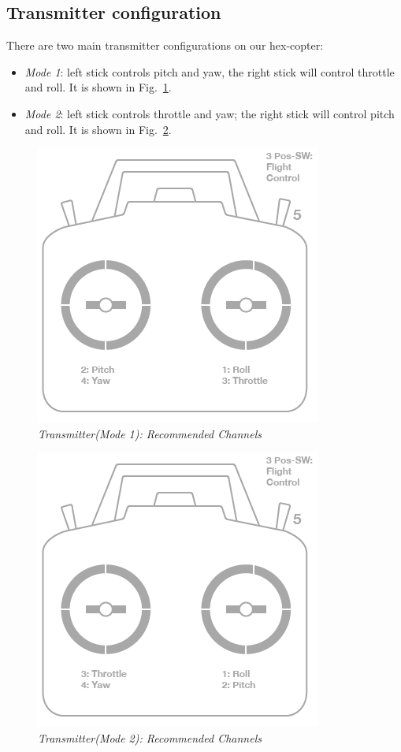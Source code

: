 \subsection{Transmitter configuration}
There are two main transmitter configurations on our hex-copter:
\begin{itemize}
	\item \textit{Mode 1}: left stick controls pitch and yaw, the right stick will control throttle and roll. It is shown in Fig.~\ref{fig: mos_1}.
	\item \textit{Mode 2}: left stick controls throttle and yaw; the right stick will control pitch and roll. It is shown in Fig.~\ref{fig: mos_2}.
\end{itemize}
\begin{figure}[h]
	\includegraphics[width=0.5\linewidth]{radio_setup_mode_1}
	\centering
	\caption{\label{fig: mos_1}\textit{Transmitter(Mode 1): Recommended Channels}}
\end{figure}

\begin{figure}[h]
	\includegraphics[width=0.5\linewidth]{rc_transmitter_mode2_setup}
	\centering
	\caption{\label{fig: mos_2}\textit{Transmitter(Mode 2): Recommended Channels}}
\end{figure}


